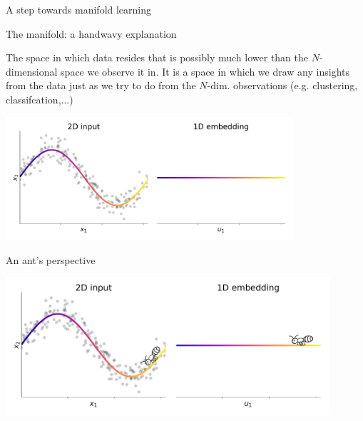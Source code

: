 \begin{frame}{A step towards manifold learning}

\begin{block}{The manifold: a handwavy explanation}

The space in which data resides that is possibly much lower than the $N$-dimensional space we observe it in.
It is a space in which we draw any insights from the data just as we try to do from the $N$-dim. observations (e.g. clustering, classifcation,...)

\end{block}

\pause

\begin{center}
	\includegraphics[width=0.8\textwidth]{img/sin_manifold}
\end{center}

\end{frame}

\begin{frame}{An ant's perspective}

\begin{center}
	\includegraphics[width=0.9\textwidth]{img/sin_manifold_ant}
\end{center}

\end{frame}

